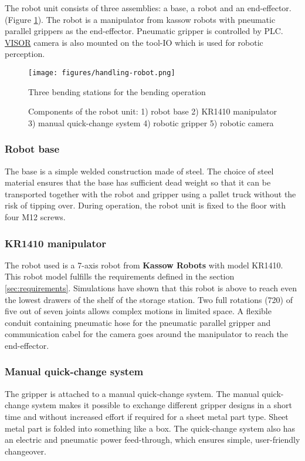 The robot unit consists of three assemblies: a base, a robot and an end-effector. (Figure \ref{fig:robot-installation}).
The robot is a manipulator from kassow robots with pneumatic parallel grippers as the end-effector.
Pneumatic gripper is controlled by PLC. \hyperref[acro:VISOR]{VISOR\textsuperscript{\textregistered}} camera is also mounted on the tool-IO which is used for robotic perception.


\begin{figure}[h]
    \centering
    \texttt{[image: figures/handling-robot.png]}
    \caption{Three bending stations for the bending operation}
    \caption{Components of the robot unit: 1) robot base 2) KR1410 manipulator 3) manual quick-change system 4) robotic gripper 5) robotic camera}
    \label{fig:robot-installation}
\end{figure}



\subsubsection{Robot base}
The base is a simple welded construction made of steel. The choice of steel material ensures that the base has
sufficient dead weight so that it can be transported together with the robot and gripper using a pallet
truck without the risk of tipping over. During operation, the robot unit is fixed to the floor with four M12
screws. 

\subsubsection{KR1410 manipulator}
The robot used is a 7-axis robot from \textbf{Kassow Robots} with model KR1410. This robot model fulfills the requirements defined in 
the section \ref{sec:requirements}. Simulations have shown that this robot is above to reach even the lowest drawers of the shelf of the
storage station. Two full rotations (720\textdegree) of five out of seven joints allows complex motions in limited space.
A flexible conduit containing pneumatic hose for the pneumatic parallel gripper and communication cabel for the camera goes around the manipulator to reach the end-effector.



\subsubsection{Manual quick-change system}
The gripper is attached to a manual quick-change
system. The manual quick-change system makes it possible to exchange different gripper
designs in a short time and without increased effort if required for a sheet metal part type. Sheet metal
part is folded into something like a box. The quick-change system also has an electric and pneumatic power feed-through, which ensures simple,
user-friendly changeover.

